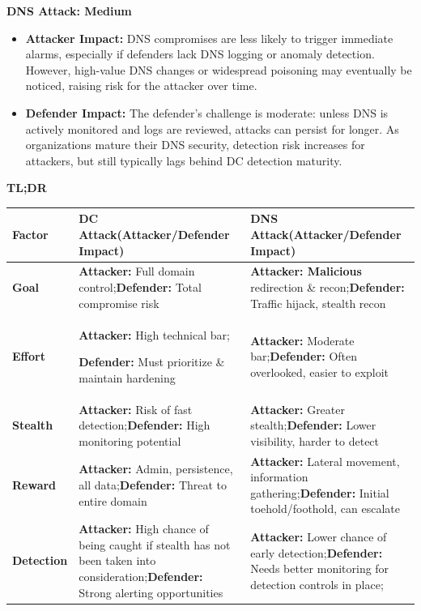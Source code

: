 \textbf{DNS Attack: Medium}

\begin{itemize}
    \item \textbf{\textbf{Attacker Impact:}}
DNS compromises are less likely to trigger immediate alarms, especially if defenders lack DNS logging or anomaly detection. However, high-value DNS changes or widespread poisoning may eventually be noticed, raising risk for the attacker over time.

    \item \textbf{\textbf{Defender Impact:}}
The defender’s challenge is moderate: unless DNS is actively monitored and logs are reviewed, attacks can persist for longer. As organizations mature their DNS security, detection risk increases for attackers, but still typically lags behind DC detection maturity.

\end{itemize}
\textbf{TL;DR}

\begin{table}
\centering

\begin{tabular}{l l l}
\textbf{Factor} & \textbf{DC Attack}\textbf{(Attacker/Defender Impact)} & \textbf{DNS Attack}\textbf{(Attacker/Defender Impact)} \\
\hline
\textbf{Goal} & \textbf{Attacker: }Full domain control;\textbf{Defender: }Total compromise risk & \textbf{Attacker: Malicious }redirection \& recon;\textbf{Defender: }Traffic hijack, stealth recon \\
\hline
\textbf{Effort} & \textbf{Attacker: }High technical bar;

\textbf{Defender: }Must prioritize \& maintain hardening & \textbf{Attacker: }Moderate bar;\textbf{Defender: }Often overlooked, easier to exploit \\
\hline
\textbf{Stealth} & \textbf{Attacker: }Risk of fast detection;\textbf{Defender: }High monitoring potential & \textbf{Attacker: }Greater stealth;\textbf{Defender: }Lower visibility, harder to detect \\
\hline
\textbf{Reward} & \textbf{Attacker: }Admin, persistence, all data;\textbf{Defender: }Threat to entire domain & \textbf{Attacker: }Lateral movement, information gathering;\textbf{Defender: }Initial toehold/foothold, can escalate \\
\hline
\textbf{Detection} & \textbf{Attacker: }High chance of being caught if stealth has not been taken into consideration;\textbf{Defender: }Strong alerting opportunities & \textbf{Attacker: }Lower chance of early detection;\textbf{Defender: }Needs better monitoring for detection controls in place; \\

\end{tabular}

\end{table}

